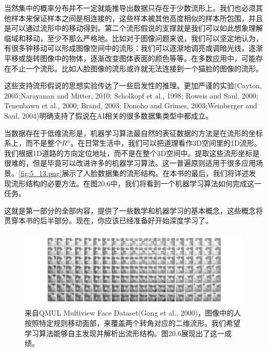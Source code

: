 当然集中的概率分布并不一定就能推导出数据只存在于少数流形上。我们也必须其他样本来保证样本之间是相连接的，这些样本被其他高度相似的样本所包围，并且是可以通过流形中的移动得到。第二个流形假说的支撑就是我们可以如此想象理解临域和移动，至少不那么严格地。比如对于图像问题来说，我们可以坚定地认为，有很多钟移动可以形成图像空间中的流形：我们可以逐渐地调亮或调暗光线，逐渐平移或旋转图像中的物体，逐渐改变图体表面的颜色等等。在多数应用中，可能存在不止一个流形。比如人脸图像的流形或许就无法连接到一个猫脸的图像的流形。

这些支持流形假说的思想实验传达了一些启发性的推理。更加严谨的实验(Cayton, 2005;Narayanan and Mitter, 2010; Scholkopf et al., 1998; Roweis and Saul, 2000; Tenenbawn et al., 2000; Brand, 2003; Donoho and Grimes, 2003;Weinberger and Saul, 2004)明确支持了假说在AI相关的很多数据集类型中都成立。

当数据存在于低维流形是，机器学习算法最自然的表征数据的方法是在流形的坐标系上，而不是整个$R^n$。在日常生活中，我们可以把道理看作3D空间里的1D流形。我们根据1D道路的方向定位地址，而不是在整个3D空间中。提取这些流形坐标是很难的，但是毕竟可以改进许多的机器学习算法。这一普遍原则适用于很多应用场景。\ref{fig:5_13.png}展示了人脸数据集的流形结构。在本书的最后，我们将详述发现流形结构的必要方法。在图20.6中，我们将看到一个机器学习算法如何完成这一任务。

这就是第一部分的全部内容，提供了一些数学和机器学习的基本概念，这些概念将贯穿本书的后半部分。现在，你应该已经准备好开始深度学习了。

\begin{figure}[htbp]
   \centering
   \includegraphics[width=6in]{fig/chap5/5_13.png} 
   \caption{来自QMUL Multiview Face Dataset(Gong et al., 2000)，图像中的人按照特定规则移动面部，来覆盖两个转角对应的二维流形。我们希望学习算法能够自主发现并解析出流形结构。图20.6展现出了这一成绩。}
   \label{fig:5_13}
\end{figure}
